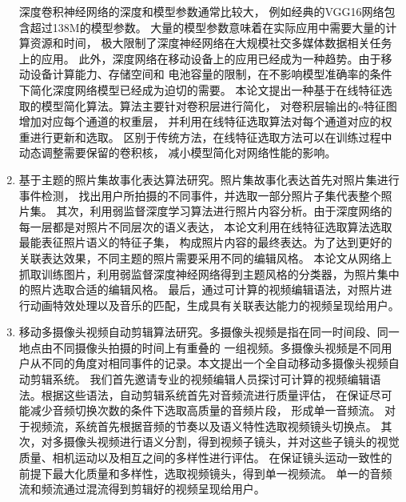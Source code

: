\documentclass[doctor]{ustcthesis}
\begin{document}
\begin{enumerate}
        深度卷积神经网络的深度和模型参数通常比较大，
        例如经典的VGG16网络包含超过138M的模型参数。
        大量的模型参数意味着在实际应用中需要大量的计算资源和时间，
        极大限制了深度神经网络在大规模社交多媒体数据相关任务上的应用。
        此外，深度网络在移动设备上的应用已经成为一种趋势。由于移动设备计算能力、存储空间和
        电池容量的限制，在不影响模型准确率的条件下简化深度网络模型已经成为迫切的需要。
        本论文提出一种基于在线特征选取的模型简化算法。算法主要针对卷积层进行简化，
        对卷积层输出的e特征图增加对应每个通道的权重层，
        并利用在线特征选取算法对每个通道对应的权重进行更新和选取。
        区别于传统方法，在线特征选取方法可以在训练过程中动态调整需要保留的卷积核，
        减小模型简化对网络性能的影响。

    \item 基于主题的照片集故事化表达算法研究。照片集故事化表达首先对照片集进行事件检测，
        找出用户所拍摄的不同事件，并选取一部分照片子集代表整个照片集。
        其次，利用弱监督深度学习算法进行照片内容分析。由于深度网络的每一层都是对照片不同层次的语义表达，
        本论文利用在线特征选取算法选取最能表征照片语义的特征子集，
        构成照片内容的最终表达。为了达到更好的关联表达效果，不同主题的照片需要采用不同的编辑风格。
        本论文从网络上抓取训练图片，利用弱监督深度神经网络得到主题风格的分类器，为照片集中的照片选取合适的编辑风格。
        最后，通过可计算的视频编辑语法，对照片进行动画特效处理以及音乐的匹配，生成具有关联表达能力的视频呈现给用户。

    \item 移动多摄像头视频自动剪辑算法研究。多摄像头视频是指在同一时间段、同一地点由不同摄像头拍摄的时间上有重叠的
        一组视频。多摄像头视频是不同用户从不同的角度对相同事件的记录。本文提出一个全自动移动多摄像头视频自动剪辑系统。
        我们首先邀请专业的视频编辑人员探讨可计算的视频编辑语法。根据这些语法，自动剪辑系统首先对音频流进行质量评估，
        在保证尽可能减少音频切换次数的条件下选取高质量的音频片段， 形成单一音频流。
        对于视频流，系统首先根据音频的节奏以及语义特性选取视频镜头切换点。
        其次，对多摄像头视频进行语义分割，得到视频子镜头，并对这些子镜头的视觉质量、相机运动以及相互之间的多样性进行评估。
        在保证镜头运动一致性的前提下最大化质量和多样性，选取视频镜头，得到单一视频流。
        单一的音频流和频流通过混流得到剪辑好的视频呈现给用户。
\end{enumerate}
\end{document}
